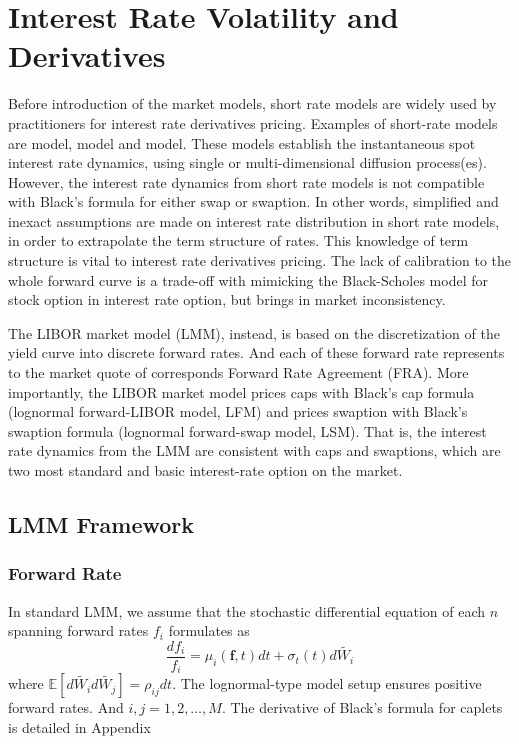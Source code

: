 \chapter{Interest Rate Volatility and Derivatives}\label{chap::LMM}

Before introduction of the market models, short rate models are widely used by practitioners for interest rate derivatives pricing. Examples of short-rate models are \cite{vo97} model, \cite{cir85} model and \cite{jh90} model. These models establish the instantaneous spot interest rate dynamics, using single or multi-dimensional diffusion process(es). However, the interest rate dynamics from short rate models is not compatible with Black's formula for either swap or swaption. In other words, simplified and inexact assumptions are made on interest rate distribution in short rate models, in order to extrapolate the term structure of rates. This knowledge of term structure is vital to interest rate derivatives pricing. The lack of calibration to the whole forward curve is a trade-off with mimicking the Black-Scholes model for stock option in interest rate option, but brings in market inconsistency.

The LIBOR market model (LMM), instead, is based on the discretization of the yield curve into discrete forward rates. And each of these forward rate represents to the market quote of corresponds Forward Rate Agreement (FRA). More importantly, the LIBOR market model prices caps with Black's cap formula (lognormal forward-LIBOR model, LFM) and prices swaption with Black's swaption formula (lognormal forward-swap model, LSM). That is, the interest rate dynamics from the LMM are consistent with caps and swaptions, which are two most standard and basic interest-rate option on the market.

\section{LMM Framework}
\subsection{Forward Rate}
In standard LMM, we assume that the stochastic differential equation of each $n$ spanning forward rates $f_i$ formulates as
\begin{equation} \label{eqn::forward_rate}
\frac{d f_i}{f_i} = \mu_i (\mathbf{f}, t)dt + \sigma_t(t) d\tilde{W_i}
\end{equation}
where $\mathbb{E}[ d\tilde{W_i}  d\tilde{W_j}] = \rho_{ij} dt$. The lognormal-type model setup ensures positive forward rates. And $i,j=1,2,\ldots,M$. The derivative of Black's formula for caplets is detailed in Appendix

